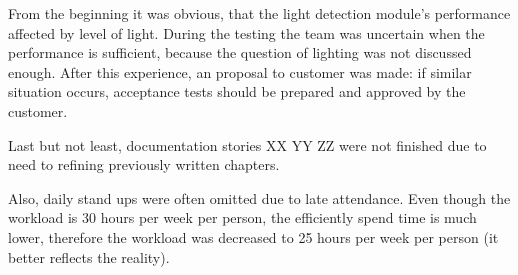 From the beginning it was obvious, that the light detection module's performance affected by level of light.
During the testing the team was uncertain when the performance is sufficient, because the question of lighting was not discussed enough.
After this experience, an proposal to customer was made: if similar situation occurs, acceptance tests should be prepared and approved by the customer.

Last but not least, documentation stories XX YY ZZ were not finished due to need to refining previously written chapters.

Also, daily stand ups were often omitted due to late attendance.
Even though the workload is 30 hours per week per person, the efficiently spend time is much lower, therefore the workload was decreased to 25 hours per week per person (it better reflects the reality).
